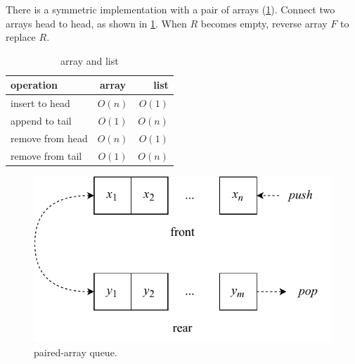 \documentclass[b5paper]{article}
\begin{document}
 \label{sec:paired-array-queue}

There is a symmetric implementation with a pair of arrays (\cref{tab:array-list-comp}). Connect two arrays head to head, as shown in \cref{fig:horseshoe-array}. When $R$ becomes empty, reverse array $F$ to replace $R$.

\begin{table}[htbp]
\centering
\begin{tabular}{l | c | r}
  \hline
  operation & array & list \\
  \hline
  insert to head & $O(n)$ & $O(1)$ \\
  append to tail & $O(1)$ & $O(n)$ \\
  remove from head & $O(n)$ & $O(1)$ \\
  remove from tail & $O(1)$ & $O(n)$ \\
  \hline
\end{tabular}
\caption{array and list}
\label{tab:array-list-comp}
\end{table}

\begin{figure}[htbp]
  \centering
  \includegraphics[scale=0.6]{img/paired-arrayq}
  \caption{paired-array queue.}
  \label{fig:horseshoe-array}
\end{figure}

\begin{Exercise}\label{ex:paired-list-queue}
\end{Exercise}
\end{document}

